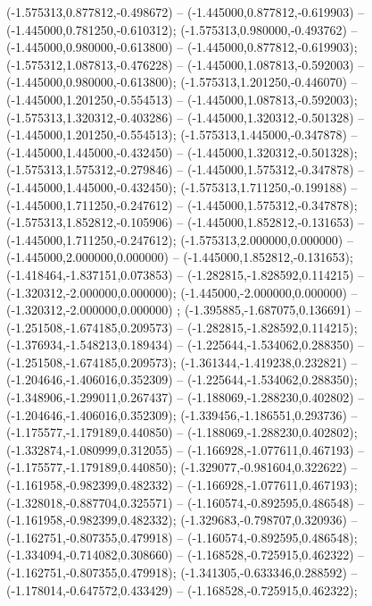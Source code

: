  (-1.575313,0.877812,-0.498672) -- (-1.445000,0.877812,-0.619903) -- (-1.445000,0.781250,-0.610312);
 (-1.575313,0.980000,-0.493762) -- (-1.445000,0.980000,-0.613800) -- (-1.445000,0.877812,-0.619903);
 (-1.575312,1.087813,-0.476228) -- (-1.445000,1.087813,-0.592003) -- (-1.445000,0.980000,-0.613800);
 (-1.575313,1.201250,-0.446070) -- (-1.445000,1.201250,-0.554513) -- (-1.445000,1.087813,-0.592003);
 (-1.575313,1.320312,-0.403286) -- (-1.445000,1.320312,-0.501328) -- (-1.445000,1.201250,-0.554513);
 (-1.575313,1.445000,-0.347878) -- (-1.445000,1.445000,-0.432450) -- (-1.445000,1.320312,-0.501328);
 (-1.575313,1.575312,-0.279846) -- (-1.445000,1.575312,-0.347878) -- (-1.445000,1.445000,-0.432450);
 (-1.575313,1.711250,-0.199188) -- (-1.445000,1.711250,-0.247612) -- (-1.445000,1.575312,-0.347878);
 (-1.575313,1.852812,-0.105906) -- (-1.445000,1.852812,-0.131653) -- (-1.445000,1.711250,-0.247612);
 (-1.575313,2.000000,0.000000) -- (-1.445000,2.000000,0.000000) -- (-1.445000,1.852812,-0.131653);
 (-1.418464,-1.837151,0.073853) -- (-1.282815,-1.828592,0.114215) -- (-1.320312,-2.000000,0.000000);
 (-1.445000,-2.000000,0.000000) -- (-1.320312,-2.000000,0.000000) ;
 (-1.395885,-1.687075,0.136691) -- (-1.251508,-1.674185,0.209573) -- (-1.282815,-1.828592,0.114215);
 (-1.376934,-1.548213,0.189434) -- (-1.225644,-1.534062,0.288350) -- (-1.251508,-1.674185,0.209573);
 (-1.361344,-1.419238,0.232821) -- (-1.204646,-1.406016,0.352309) -- (-1.225644,-1.534062,0.288350);
 (-1.348906,-1.299011,0.267437) -- (-1.188069,-1.288230,0.402802) -- (-1.204646,-1.406016,0.352309);
 (-1.339456,-1.186551,0.293736) -- (-1.175577,-1.179189,0.440850) -- (-1.188069,-1.288230,0.402802);
 (-1.332874,-1.080999,0.312055) -- (-1.166928,-1.077611,0.467193) -- (-1.175577,-1.179189,0.440850);
 (-1.329077,-0.981604,0.322622) -- (-1.161958,-0.982399,0.482332) -- (-1.166928,-1.077611,0.467193);
 (-1.328018,-0.887704,0.325571) -- (-1.160574,-0.892595,0.486548) -- (-1.161958,-0.982399,0.482332);
 (-1.329683,-0.798707,0.320936) -- (-1.162751,-0.807355,0.479918) -- (-1.160574,-0.892595,0.486548);
 (-1.334094,-0.714082,0.308660) -- (-1.168528,-0.725915,0.462322) -- (-1.162751,-0.807355,0.479918);
 (-1.341305,-0.633346,0.288592) -- (-1.178014,-0.647572,0.433429) -- (-1.168528,-0.725915,0.462322);
